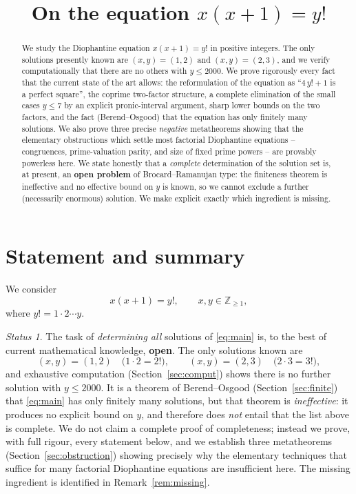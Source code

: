 \documentclass{amsart}
\theoremstyle{plain}
\theoremstyle{remark}
\newtheorem*{statusnote}{Status}
\begin{document}
\title{On the equation $x(x+1)=y!$}
\maketitle

\begin{abstract}
We study the Diophantine equation $x(x+1)=y!$ in positive integers.
The only solutions presently known are $(x,y)=(1,2)$ and $(x,y)=(2,3)$,
and we verify computationally that there are no others with $y\le 2000$.
We prove rigorously every fact that the current state of the art allows:
the reformulation of the equation as ``$4\,y!+1$ is a perfect square'',
the coprime two-factor structure, a complete elimination of the small
cases $y\le 7$ by an explicit pronic-interval argument, sharp lower bounds
on the two factors, and the fact (Berend--Osgood) that the equation has
only finitely many solutions.  We also prove three precise \emph{negative}
metatheorems showing that the elementary obstructions which settle most
factorial Diophantine equations -- congruences, prime-valuation parity, and
size of fixed prime powers -- are provably powerless here.  We state honestly
that a \emph{complete} determination of the solution set is, at present, an
\textbf{open problem} of Brocard--Ramanujan type: the finiteness theorem is
ineffective and no effective bound on $y$ is known, so we cannot exclude a
further (necessarily enormous) solution. We make explicit exactly which
ingredient is missing.
\end{abstract}

\section{Statement and summary}

We consider
\begin{equation}\label{eq:main}
   x(x+1)=y!,\qquad x,y\in\mathbb{Z}_{\ge 1},
\end{equation}
where $y!=1\cdot 2\cdots y$.

\begin{statusnote}
The task of \emph{determining all} solutions of \eqref{eq:main} is, to the
best of current mathematical knowledge, \textbf{open}.  The only solutions
known are
\[
   (x,y)=(1,2)\quad\bigl(1\cdot 2=2!\bigr),\qquad
   (x,y)=(2,3)\quad\bigl(2\cdot 3=3!\bigr),
\]
and exhaustive computation (Section~\ref{sec:comput}) shows there is no
further solution with $y\le 2000$.  It is a theorem of Berend--Osgood
(Section~\ref{sec:finite}) that \eqref{eq:main} has only finitely many
solutions, but that theorem is \emph{ineffective}: it produces no explicit
bound on $y$, and therefore does \emph{not} entail that the list above is
complete.  We do not claim a complete proof of completeness; instead we
prove, with full rigour, every statement below, and we establish three
metatheorems (Section~\ref{sec:obstruction}) showing precisely why the
elementary techniques that suffice for many factorial Diophantine equations
are insufficient here. The missing ingredient is identified in
Remark~\ref{rem:missing}.
\end{statusnote}
\end{document}
